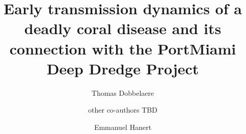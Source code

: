 \documentclass[preprint,12pt,authoryear]{elsarticle}
\begin{document}
\begin{frontmatter}



    \title{Early transmission dynamics of a deadly coral disease and its connection with the PortMiami Deep Dredge Project}%


    \author[eli]{Thomas Dobbelaere}
    \author[]{other co-authors TBD}
    \author[eli,immc]{Emmanuel Hanert}


\end{frontmatter}
\end{document}
